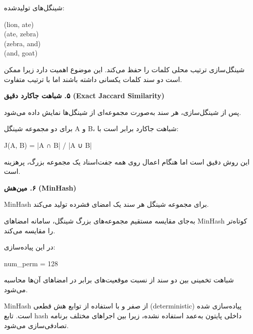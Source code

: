 \documentclass[11pt]{article}
\begin{document}
\noindent ‏شینگل‌های تولیدشده:\par

{\mycode
\begin{flushleft}
(lion, ate) \\
(ate, zebra) \\
(zebra, and) \\
(and, goat)
\end{flushleft}}

\noindent ‏شینگل‌سازی ترتیب محلی کلمات را حفظ می‌کند. این موضوع اهمیت دارد زیرا ممکن است دو سند کلمات یکسانی داشته باشند اما با ترتیب متفاوت.\par

\medskip\noindent\hrulefill\medskip

\medskip
{\large\bfseries ‏۵. شباهت جاکارد دقیق (Exact Jaccard Similarity)}\medskip


\noindent ‏پس از شینگل‌سازی، هر سند به‌صورت مجموعه‌ای از شینگل‌ها نمایش داده می‌شود.\par

\noindent ‏برای دو مجموعه شینگل A و B، شباهت جاکارد برابر است با:\par

{\mycode
\begin{flushleft}
J(A, B) = |A ∩ B| / |A ∪ B|
\end{flushleft}}

\noindent ‏این روش دقیق است اما هنگام اعمال روی همه جفت‌اسناد یک مجموعه بزرگ، پرهزینه است.\par

\medskip\noindent\hrulefill\medskip

\medskip
{\large\bfseries ‏۶. مین‌هش (MinHash)}\medskip


\noindent ‏MinHash برای مجموعه شینگل هر سند یک امضای فشرده تولید می‌کند.\par

\noindent ‏به‌جای مقایسه مستقیم مجموعه‌های بزرگ شینگل، سامانه امضاهای MinHash کوتاه‌تر را مقایسه می‌کند.\par

\noindent ‏در این پیاده‌سازی:\par

{\mycode
\begin{flushleft}
num\_perm = 128
\end{flushleft}}

\noindent ‏شباهت تخمینی بین دو سند از نسبت موقعیت‌های برابر در امضاهای آن‌ها محاسبه می‌شود.\par

\noindent ‏MinHash از صفر و با استفاده از توابع هش قطعی (deterministic) پیاده‌سازی شده است. تابع hash داخلی پایتون به‌عمد استفاده نشده، زیرا بین اجراهای مختلف برنامه تصادفی‌سازی می‌شود.\par
\end{document}
